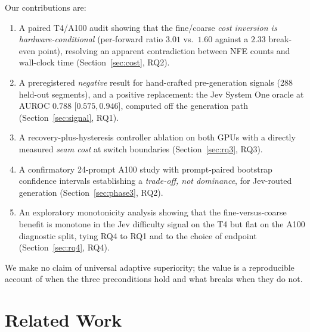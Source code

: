 \documentclass[journal]{IEEEtran}
\begin{document}
Our contributions are:
\begin{enumerate}
\item A paired T4/A100 audit showing that the fine/coarse \emph{cost inversion is hardware-conditional} (per-forward ratio $3.01$ vs.\ $1.60$ against a $2.33$ break-even point), resolving an apparent contradiction between NFE counts and wall-clock time (Section~\ref{sec:cost}, RQ2).
\item A preregistered \emph{negative} result for hand-crafted pre-generation signals (288 held-out segments), and a positive replacement: the Jev System One oracle at AUROC $0.788$ [$0.575,0.946$], computed off the generation path (Section~\ref{sec:signal}, RQ1).
\item A recovery-plus-hysteresis controller ablation on both GPUs with a directly measured \emph{seam cost} at switch boundaries (Section~\ref{sec:rq3}, RQ3).
\item A confirmatory 24-prompt A100 study with prompt-paired bootstrap confidence intervals establishing a \emph{trade-off, not dominance}, for Jev-routed generation (Section~\ref{sec:phase3}, RQ2).
\item An exploratory monotonicity analysis showing that the fine-versus-coarse benefit is monotone in the Jev difficulty signal on the T4 but flat on the A100 diagnostic split, tying RQ4 to RQ1 and to the choice of endpoint (Section~\ref{sec:rq4}, RQ4).
\end{enumerate}

We make no claim of universal adaptive superiority; the value is a reproducible account of when the three preconditions hold and what breaks when they do not.

\section{Related Work}
\label{sec:related}
\end{document}
